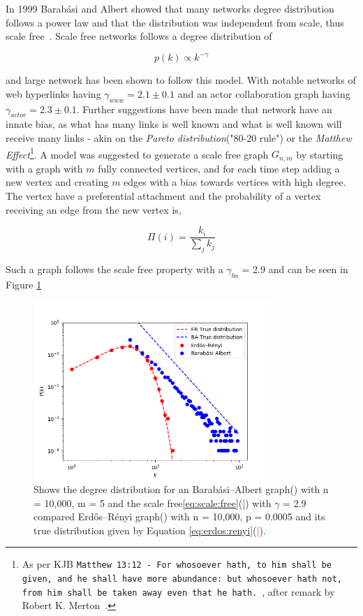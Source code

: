 In 1999 Barabási and Albert showed that many networks \gls{degree distribution} follows a power law and that the distribution was independent from scale, thus scale free~\cite{barabasi:albert:emergent:scaling}. Scale free networks follows a degree distribution of

\begin{equation}
	 p(k) \propto k^{-\gamma} 
	\label{eq:scale:free}
\end{equation}

and large network has been shown to follow this model. With notable networks of web hyperlinks having $\gamma_{www} = 2.1\pm 0.1$ and an actor collaboration graph having $\gamma_{actor} = 2.3\pm0.1$. Further suggestions have been made that network have an innate bias, as what has many links is well known and what is well known will receive many links - akin on the \textit{Pareto distribution}("80-20 rule") or the \textit{Matthew Effect}\footnote{As per KJB \texttt{Matthew 13:12 - For whosoever hath, to him shall be given, and he shall have more abundance: but whosoever hath not, from him shall be taken away even that he hath.}~\cite{king:james:bible}, after remark by Robert K. Merton~\cite{merton:matthew:effect}. }. 
A model was suggested to generate a scale free graph $G_{n, m}$ by starting with a graph with $m$ fully connected vertices, and for each time step adding a new vertex and creating $m$ edges with a bias towards vertices with high degree. The vertex have a preferential attachment and the probability of a vertex receiving an edge from the new vertex is,

\[ \Pi(i) = \dfrac{k_i}{\sum_{j}^{}k_j} \]

Such a graph follows the scale free property with a $\gamma_{ba}$ = 2.9 and can be seen in Figure \ref{fig:scale_free}

\begin{figure}[!htb]
	\hspace*{-0.5cm} 
	\centering
	\includegraphics[width=9cm]{images/scale_free_degree_distribution.png}
	\caption{Shows the degree distribution for an Barabási–Albert graph(\tikzcircle[blue, fill=blue]{2pt}) with n = 10,000, m = 5 and the scale free\ref{eq:scale:free}(\textcolor{blue}{|}) with $\gamma$ = 2.9 compared Erdős–Rényi graph(\tikzcircle[red, fill=red]{2pt}) with n = 10,000, p = 0.0005 and its true distribution given by Equation \ref{eq:erdos:renyi}(\textcolor{red}{|}).
	}
	\label{fig:scale_free}
	\hspace*{2mm} 
\end{figure}

